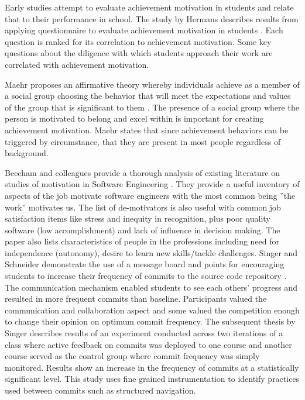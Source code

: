 \documentclass{sig-alternate}
\begin{document}
Early studies attempt to evaluate achievement motivation in students and relate that to their performance in school.  The study by Hermans describes results from applying questionnaire to evaluate achievement motivation in students \cite{wbsnipes:Hermans1970Questionnaire}.  Each question is ranked for its correlation to achievement motivation. Some key questions about the diligence with which students approach their work are correlated with achievement motivation.  

Maehr proposes an affirmative theory whereby  individuals achieve as a member of a social group choosing the behavior that will meet the expectations and values of the group that is significant to them \cite{wbsnipes:MaehrCulture}.  The presence of a social group where the person is motivated to belong and excel within is important for creating achievement motivation.  Maehr states that since achievement behaviors can be triggered by circumstance, that they are present in most people regardless of background. 

Beecham and colleagues provide a thorough analysis of existing literature on studies of motivation in Software Engineering \cite{wbsnipes:Beecham2008Motivation}.  They provide a useful inventory of aspects of the job motivate software engineers with the most common being ''the work'' motivates us. The list of de-motivators is also useful with common job satisfaction items like stress and inequity in recognition, plus poor quality software (low accomplishment) and lack of influence in decision making. The paper also lists characteristics of people in the professions including need for independence (autonomy), desire to learn new skills/tackle challenges. 
Singer and Schneider demonstrate the use of a message board and points for encouraging students to increase their frequency of commits to the source code repository \cite{Singer2012It}.  The communication mechanism enabled students to see each others' progress and resulted in more frequent commits than baseline.  Participants valued the communication and collaboration aspect and some valued the competition enough to change their opinion on optimum commit frequency.  The subsequent thesis by Singer \cite{Singer2013a} describes results of an experiment conducted across two iterations of a class where active feedback on commits was deployed to one course and another course served as the control group where commit frequency was simply monitored.  Results show an increase in the frequency of commits at a statistically significant level.  This study uses fine grained instrumentation to identify practices used between commits such as structured navigation.
\end{document}
